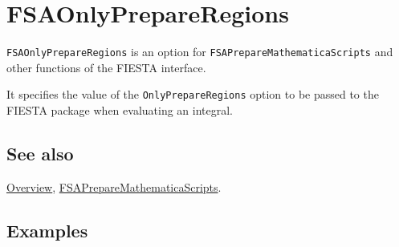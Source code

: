 \documentclass[../FeynHelpersManual.tex]{subfiles}
\begin{document}
\hypertarget{fsaonlyprepareregions}{
\section{FSAOnlyPrepareRegions}\label{fsaonlyprepareregions}}

\texttt{FSAOnlyPrepareRegions} is an option for
\texttt{FSAPrepareMathematicaScripts} and other functions of the FIESTA
interface.

It specifies the value of the \texttt{OnlyPrepareRegions} option to be
passed to the FIESTA package when evaluating an integral.

\subsection{See also}

\hyperlink{toc}{Overview},
\hyperlink{fsapreparemathematicascripts}{FSAPrepareMathematicaScripts}.

\subsection{Examples}
\end{document}
